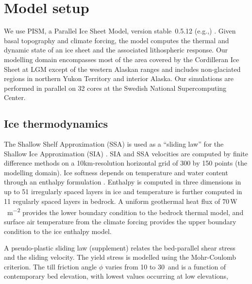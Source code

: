 \section{Model setup}
\label{sec:model}

We use PISM, a Parallel Ice Sheet Model, version stable~0.5.12 (e.g.,) \citep{bueler-brown-2009,winkelmann-etal-2011,aschwanden-etal-2012,web:pism}. Given basal topography and climate forcing, the model computes the thermal and dynamic state of an ice sheet and the associated lithospheric response. Our modelling domain encompasses most of the area covered by the Cordilleran Ice Sheet at LGM except of the western Alaskan ranges and includes non-glaciated regions in northern Yukon Territory and interior Alaska. Our simulations are performed in parallel on 32 cores at the Swedish National Supercomputing Center.

\subsection{Ice thermodynamics}

The Shallow Shelf Approximation (SSA) is used as a ``sliding law'' for the Shallow Ice Approximation (SIA) \citep{winkelmann-etal-2011}. SIA and SSA velocities are computed by finite difference methods on a 10km-resolution horizontal grid of 300 by 150 points (the modelling domain). Ice softness depends on temperature and water content through an enthalpy formulation \citep{aschwanden-blatter-2009,aschwanden-etal-2012}. Enthalpy is computed in three dimensions in up to 51 irregularly spaced layers in ice and temperature is further computed in 11 regularly spaced layers in bedrock. A uniform geothermal heat flux of 70\,\unit{W\,m^{-2}} provides the lower boundary condition to the bedrock thermal model, and surface air temperature from the climate forcing provides the upper boundary condition to the ice enthalpy model.

A pseudo-plastic sliding law \citep{aschwanden-etal-2013} (supplement) relates the bed-parallel shear stress and the sliding velocity. The yield stress is modelled using the Mohr-Coulomb criterion. The till friction angle $\phi$ varies from 10 to 30\degree\ and is a function of contemporary bed elevation, with lowest values occurring at low elevations,


